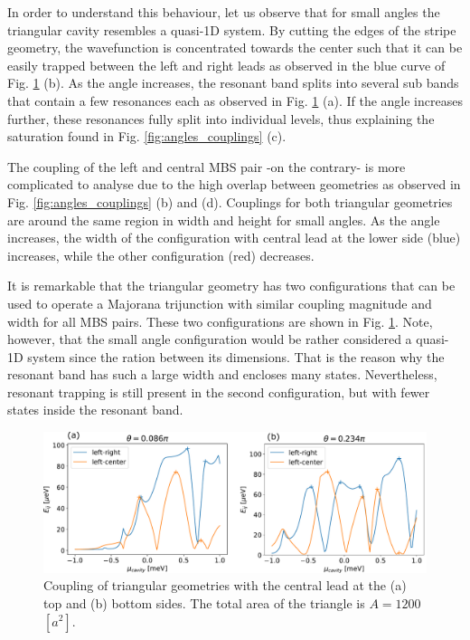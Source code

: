 In order to understand this behaviour, let us observe that for small angles the triangular cavity resembles a quasi-1D system.
By cutting the edges of the stripe geometry, the wavefunction is concentrated towards the center such that it can be easily trapped between the left and right leads as observed in the blue curve of Fig. \ref{fig:triangle_transition} (b).
As the angle increases, the resonant band splits into several sub bands that contain a few resonances each as observed in Fig. \ref{fig:triangle_transition} (a).
If the angle increases further, these resonances fully split into individual levels, thus explaining the saturation found in Fig. \ref{fig:angles_couplings} (c).

The coupling of the left and central MBS pair -on the contrary- is more complicated to analyse due to the high overlap between geometries as observed in Fig. \ref{fig:angles_couplings} (b) and (d).
Couplings for both triangular geometries are around the same region in width and height for small angles.
As the angle increases, the width of the configuration with central lead at the lower side (blue) increases, while the other configuration (red) decreases.

It is remarkable that the triangular geometry has two configurations that can be used to operate a Majorana trijunction with similar coupling magnitude and width for all MBS pairs.
These two configurations are shown in Fig. \ref{fig:triangle_transition}.
Note, however, that the small angle configuration would be rather considered a quasi-1D system since the ration between its dimensions.
That is the reason why the resonant band has such a large width and encloses many states.
Nevertheless, resonant trapping is still present in the second configuration, but with fewer states inside the resonant band.

\begin{figure}[h!]
\centering
  \includegraphics[width=0.8\linewidth]{figures/triangle_couplings.pdf}
  \caption{Coupling of triangular geometries with the central lead at the (a) top and (b) bottom sides. The total area of the triangle is $A=1200$ $[a^2]$.}
  \label{fig:triangle_transition}
\end{figure}

